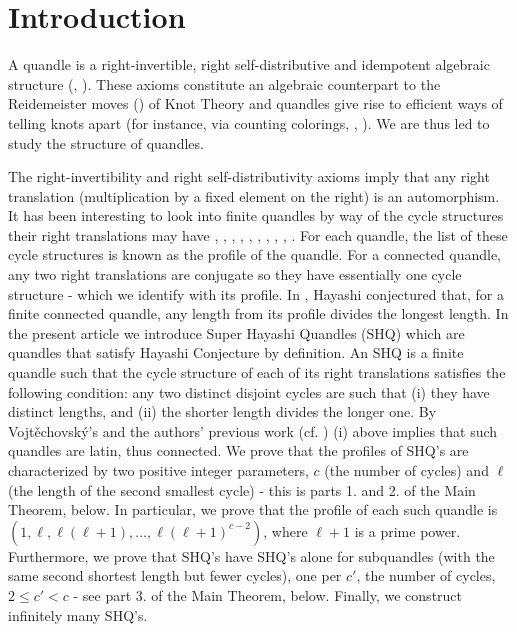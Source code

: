 \documentclass{article}
\begin{document}
\section{Introduction}

A quandle is a right-invertible,  right self-distributive and idempotent algebraic structure (\cite{Joyce}, \cite{Matveev}). These axioms constitute an algebraic counterpart to the Reidemeister moves (\cite{Kauffman}) of Knot Theory and quandles give rise to efficient ways of telling knots apart (for instance, via counting colorings, \cite{Dionisio_Lopes}, \cite{Bojarczuk_Lopes}). We are thus led to study the structure of quandles.\par

The right-invertibility and right self-distributivity axioms imply  that any right translation (multiplication by a fixed element on the right) is an automorphism. It has been interesting to look into finite quandles by way of the cycle structures their right translations may have \cite{Lopes_Roseman}, \cite{Hayashi}, \cite{Kajiwara_Nakayama}, \cite{KamadaTamaruWada}, \cite{Lages_Lopes_Cyclic}, \cite{Lages_Lopes_Vojtěchovský}, \cite{Lages_Lopes}, \cite{Watanabe1}, \cite{Watanabe2}, \cite{Watanabe3}. For each quandle, the list of these cycle structures is known as the profile of the quandle. For a connected quandle, any two right translations are conjugate so they have essentially one cycle structure - which we identify with its profile. In \cite{Hayashi}, Hayashi conjectured that, for a finite connected quandle, any length from its profile divides the longest length. In the present article we introduce  Super Hayashi Quandles (SHQ) which are quandles that satisfy Hayashi Conjecture by definition. An SHQ is a finite quandle such that   the cycle structure of each of its right translations satisfies the following condition: any two distinct disjoint cycles are such that (i) they have distinct lengths, and (ii) the shorter length divides the longer one. By Vojt\v{e}chovsk\'y's and the authors' previous work (cf. \cite{Lages_Lopes_Vojtěchovský}) (i) above implies that such quandles are latin, thus connected. We prove that the profiles of SHQ's are characterized by two positive integer parameters, $c$ (the number of cycles) and $\ell$ (the length of the second smallest cycle) - this is parts 1. and 2. of the Main Theorem, below. In particular, we prove that the profile of each such quandle is $(1,\ell,\ell(\ell+1),\dots,\ell(\ell+1)^{c-2})$, where $\ell+1$ is a prime power. Furthermore, we prove that SHQ's have SHQ's alone for subquandles (with the same second shortest length but fewer cycles), one per $c'$, the number of cycles, $2\leq c' < c$ - see part 3. of the Main Theorem, below. Finally, we construct infinitely many SHQ's.\par
\end{document}
